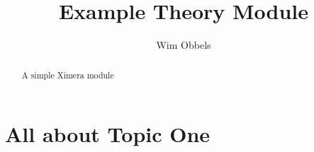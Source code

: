 \documentclass{xourse}
\begin{document}
    \author{Wim Obbels}
    \title{Example Theory Module}
    \begin{abstract}  A simple Ximera module \end{abstract}
    \maketitle

\chapterstyle
\part{All about Topic One}
\end{document}
